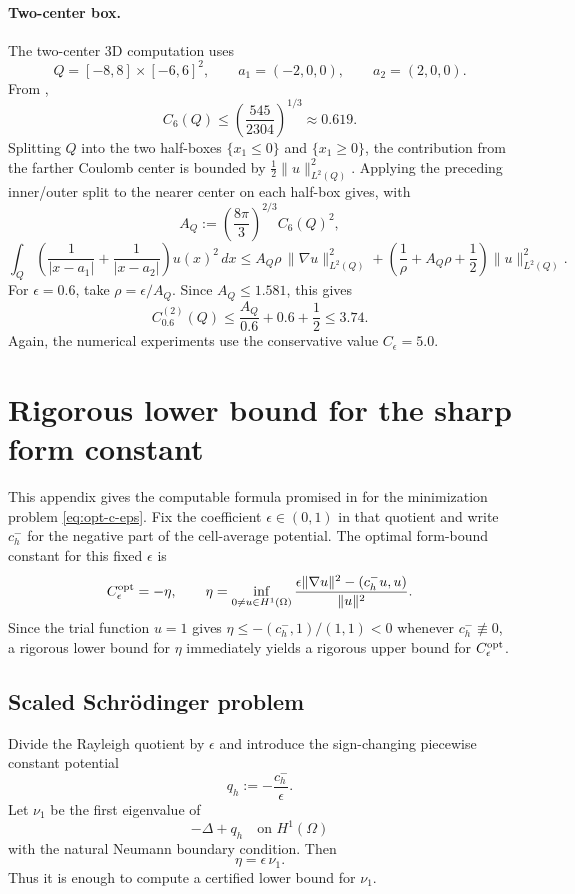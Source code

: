 \documentclass[11pt]{article}
\theoremstyle{plain}
\theoremstyle{definition}
\theoremstyle{remark}
\begin{document}
\paragraph{Two-center box.}
The two-center 3D computation uses
\[
Q=[-8,8]\times[-6,6]^2,\qquad
a_1=(-2,0,0),\qquad a_2=(2,0,0).
\]
From ,
\[
  C_6(Q)\le \left(\frac{545}{2304}\right)^{1/3}\approx0.619.
\]
Splitting \(Q\) into the two half-boxes \(\{x_1\le0\}\) and \(\{x_1\ge0\}\),
the contribution from the farther Coulomb center is bounded by
\(\frac12\|u\|_{L^2(Q)}^2\).  Applying the preceding inner/outer split to
the nearer center on each half-box gives, with
\[
  A_Q:=\left(\frac{8\pi}{3}\right)^{2/3}C_6(Q)^2,
\]
\[
\int_Q\left(\frac1{|x-a_1|}+\frac1{|x-a_2|}\right)u(x)^2\,dx
\le
A_Q\rho\,\|\nabla u\|_{L^2(Q)}^2
+
\left(\frac1\rho+A_Q\rho+\frac12\right)\|u\|_{L^2(Q)}^2 .
\]
For \(\epsilon=0.6\), take \(\rho=\epsilon/A_Q\).  Since
\(A_Q\le1.581\), this gives
\begin{equation}
\label{eq:ceps-box-3d-two-center}
  C_{0.6}^{(2)}(Q)
  \le
  \frac{A_Q}{0.6}+0.6+\frac12
  \le 3.74 .
\end{equation}
Again, the numerical experiments use the conservative value
\(C_\epsilon=5.0\).

\section{Rigorous lower bound for the sharp form constant}
\label{app:ceps-eta}

This appendix gives the computable formula promised in
 for the minimization problem
\eqref{eq:opt-c-eps}.  Fix the coefficient $\epsilon\in(0,1)$ in that
quotient and write $c_h^-$ for the negative part of the cell-average
potential.
The optimal form-bound constant for this fixed $\epsilon$ is
\[
  C_\epsilon^{\rm opt}=-\eta,\qquad
  \eta
  =
  \inf_{0\ne u\in H^1(\Omega)}
  \frac{\epsilon\|\nabla u\|^2-(c_h^-u,u)}{\|u\|^2}.
\]
Since the trial function $u=1$ gives $\eta\le -(c_h^-,1)/(1,1)<0$ whenever
$c_h^-\not\equiv0$, a rigorous lower bound for $\eta$ immediately yields a
rigorous upper bound for $C_\epsilon^{\rm opt}$.

\subsection*{Scaled Schr\"odinger problem}

Divide the Rayleigh quotient by $\epsilon$ and introduce the sign-changing
piecewise constant potential
\[
  q_h:=-\frac{c_h^-}{\epsilon}.
\]
Let $\nu_1$ be the first eigenvalue of
\[
  -\Delta + q_h
  \quad\text{on }H^1(\Omega)
\]
with the natural Neumann boundary condition.  Then
\begin{equation}
\label{eq:eta-nu-scale}
  \eta=\epsilon\,\nu_1.
\end{equation}
Thus it is enough to compute a certified lower bound for $\nu_1$.
\end{document}

